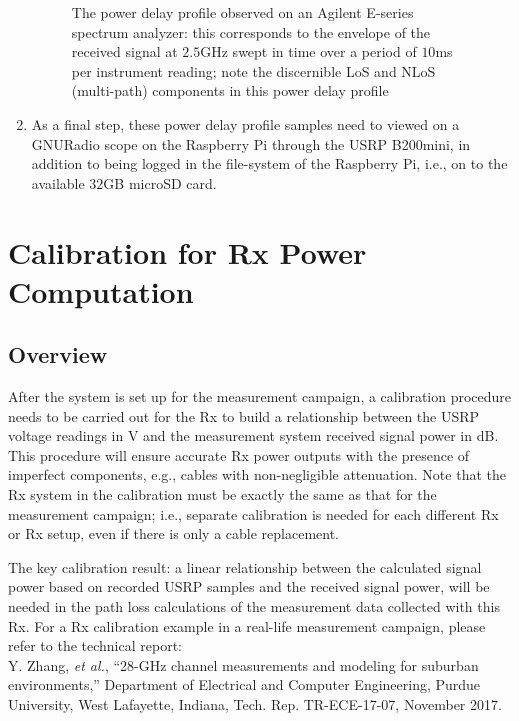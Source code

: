 \documentclass[12pt, draftcls, onecolumn]{IEEEtran}
\begin{document}
\begin{enumerate}
\begin{figure}
        \caption{The power delay profile observed on an Agilent E-series spectrum analyzer: this corresponds to the envelope of the received signal at $2.5$GHz swept in time over a period of $10$ms per instrument reading; note the discernible LoS and NLoS (multi-path) components in this power delay profile}
        \label{fig:13}
    \end{figure}
    \item As a final step, these power delay profile samples need to viewed on a GNURadio scope on the Raspberry Pi through the USRP B200mini, in addition to being logged in the file-system of the Raspberry Pi, i.e., on to the available $32$GB microSD card.
\end{enumerate}

\section{Calibration for Rx Power Computation}
\label{sec_calibration}

\subsection{Overview}
After the system is set up for the measurement campaign, a calibration procedure needs to be carried out for the Rx to build a relationship between the USRP voltage readings in V and the measurement system received signal power in dB. This procedure will ensure accurate Rx power outputs with the presence of imperfect components, e.g., cables with non-negligible attenuation. Note that the Rx system in the calibration must be exactly the same as that for the measurement campaign; i.e., separate calibration is needed for each different Rx or Rx setup, even if there is only a cable replacement. 

The key calibration result: a linear relationship between the calculated signal power based on recorded USRP samples and the received signal power, will be needed in the path loss calculations of the measurement data collected with this Rx. For a Rx calibration example in a real-life measurement campaign, please refer to the technical report:\\
Y. Zhang, \textit{et al.}, “28-GHz channel measurements and modeling for suburban environments,” Department of Electrical and Computer Engineering, Purdue University, West Lafayette, Indiana, Tech. Rep. TR-ECE-17-07, November 2017.
\end{document}
